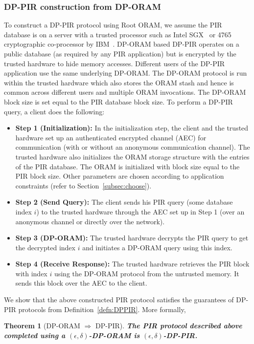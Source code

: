 \documentclass[USenglish,oneside,twocolumn]{article}
\newtheorem{theorem}{Theorem}
\newcommand{\ourprotocol}{Root ORAM}
\begin{document}
\subsubsection{DP-PIR construction from DP-ORAM}\label{subsec:DPPIRProtocol}
\vspace{-4mm}
\noindent To construct a DP-PIR protocol using \ourprotocol{}, we assume the PIR database is on a server with a trusted processor such as Intel SGX~\cite{sgxreference} or 4765 cryptographic co-processor by IBM~\cite{ibmcryptocards}. DP-ORAM based DP-PIR operates on a public database (as required by any PIR application) but is encrypted by the trusted hardware to hide memory accesses. Different users of the DP-PIR application use the same underlying DP-ORAM. 
The DP-ORAM protocol is run within the trusted hardware which also stores the ORAM stash and hence is common across different users and multiple ORAM invocations.
The DP-ORAM block size is set equal to the PIR database block size. To perform a DP-PIR query, a client does the following: 
\begin{itemize}
\itemsep0em
\item \textbf{Step 1 (Initialization):} In the initialization step, the client and the trusted hardware set up an authenticated encrypted channel (AEC) for communication (with or without an anonymous communication channel). The trusted hardware also initializes the ORAM storage structure with the entries of the PIR database. The ORAM is initialized with block size equal to the PIR block size. Other parameters are chosen according to application constraints (refer to Section~\ref{subsec:choose}).
\item \textbf{Step 2 (Send Query): }The client sends his PIR query (some database index $i$) to the trusted hardware through the AEC set up in Step 1 (over an anonymous channel or directly over the network).
\item \textbf{Step 3 (DP-ORAM): }The trusted hardware decrypts the PIR query to get the decrypted index $i$ and initiates a DP-ORAM query using this index.
\item \textbf{Step 4 (Receive Response): }The trusted hardware retrieves the PIR block with index $i$ using the DP-ORAM protocol from the untrusted memory. It sends this block over the AEC to the client. 
\end{itemize}
We show that the above constructed PIR protocol satisfies the guarantees of DP-PIR protocols from Definition~\ref{defn:DPPIR}. More formally,

\begin{theorem}[DP-ORAM $\Rightarrow$ DP-PIR]\label{thm:DPORAMtoPIR}
\textbf{The PIR protocol described above completed using a $(\epsilon, \delta)$-DP-ORAM is $(\epsilon, \delta)$-DP-PIR.}
\end{theorem}
\end{document}
